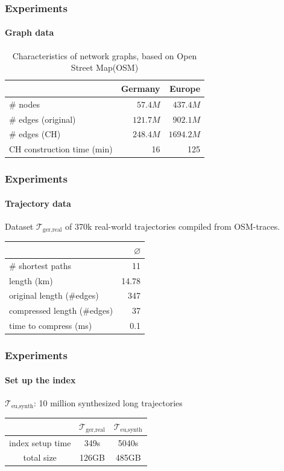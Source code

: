 \documentclass[10pt, t,
aspectratio=1610,%
usenames,
dvipsnames,
]{beamer}
\newcommand{\traj}[2]{\mathcal{T}_{\text{#1},\text{#2}}}
\begin{document}
\begin{frame}
	\frametitle{Experiments}
	\framesubtitle{Graph data}
	\begin{table}
		{
			\caption{Characteristics of network graphs, based on Open Street Map(OSM)}
			\begin{tabular}{|l|rr|}
				\hline
				                           & Germany  & Europe
				\\ \hline
				\# nodes                   & $57.4M$  & $437.4M$  \\
				\# edges (original)        & $121.7M$ & $902.1M$  \\
				\# edges (CH)              & $248.4M$ & $1694.2M$ \\
				CH construction time (min) & 16       & 125       \\
				\hline
			\end{tabular}
		}
	\end{table}
\end{frame}

\begin{frame}
	\frametitle{Experiments}
	\framesubtitle{Trajectory data}
	Dataset $\traj{ger}{real}$ of 370k real-world trajectories compiled from OSM-traces.
	\begin{table}
		{
			\begin{tabular}{|l|r|}
				\hline
				                            & $\varnothing$ \\
				\hline
				\# shortest paths           & 11            \\
				length (km)                 & 14.78         \\
				original length (\#edges)   & 347           \\
				compressed length (\#edges) & 37            \\
				time to compress (ms)       & 0.1           \\
				\hline
			\end{tabular}
		}
	\end{table}
\end{frame}

\begin{frame}
	\frametitle{Experiments}
	\framesubtitle{Set up the index}
	\begin{table}
		{
			$\traj{eu}{synth}$: 10 million synthesized long trajectories \pause

			\centering
			\begin{tabular}{|c|cc|}
				\hline
				                 & $\traj{ger}{real}$ & $\traj{eu}{synth}$ \\
				\hline
				index setup time & 349s               & 5040s              \\
				total size       & 126GB              & 485GB              \\
				\hline
			\end{tabular}
		}
	\end{table}
\end{frame}
\end{document}
